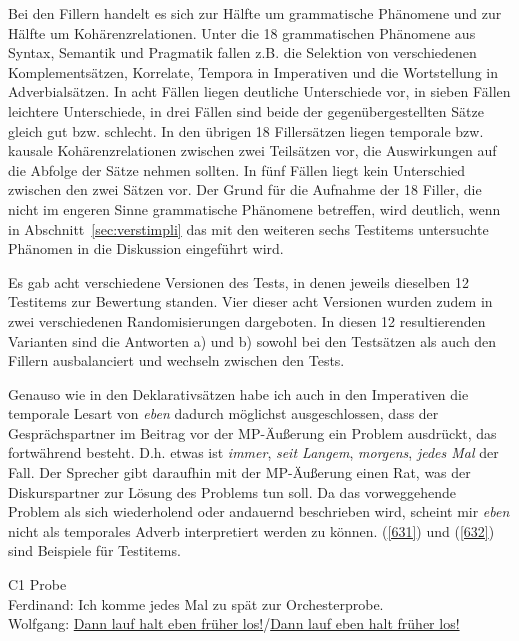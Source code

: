 Bei den Fillern handelt es sich zur Hälfte um grammatische Phänomene und zur Hälfte um  Kohärenzrelationen. Unter die 18 grammatischen Phänomene aus Syntax, Semantik und Pragmatik fallen z.B. die Selektion von verschiedenen Komplementsätzen, Korrelate, Tempora in Imperativen und die Wortstellung in Adverbialsätzen. In acht Fällen liegen deutliche Unterschiede vor, in sieben Fällen leichtere Unterschiede, in drei Fällen sind beide der gegenübergestellten Sätze gleich gut bzw. schlecht. In den übrigen 18 Fillersätzen liegen temporale bzw. kausale Kohärenzrelationen zwischen zwei Teilsätzen vor, die Auswirkungen auf die Abfolge der Sätze nehmen sollten. In fünf Fällen liegt kein Unterschied zwischen den zwei Sätzen vor. Der Grund für die Aufnahme der 18 Filler, die nicht im engeren Sinne grammatische Phänomene betreffen, wird deutlich, wenn in Abschnitt~\ref{sec:verstimpli} das mit den weiteren sechs Testitems untersuchte Phäno\-men in die Diskussion eingeführt wird.

Es gab acht verschiedene Versionen des Tests, in denen jeweils dieselben 12 Testitems zur Bewertung standen. Vier dieser acht Versionen wurden zudem in zwei verschiedenen Randomisierungen dargeboten. In diesen 12 resultierenden Varianten sind die Antworten a) und b) sowohl bei den Testsätzen als auch den Fillern ausbalanciert und wechseln zwischen den Tests.

Genauso wie in den Deklarativsätzen habe ich auch in den Imperativen die temporale Lesart von \textit{eben} dadurch möglichst ausgeschlossen, dass der Gesprächs\-partner im Beitrag vor der MP-Äußerung ein Problem ausdrückt, das fortwährend besteht. D.h. etwas ist \textit{immer}, \textit{seit Langem}, \textit{morgens}, \textit{jedes Mal} der Fall. Der Sprecher gibt daraufhin mit der MP-Äußerung einen Rat, was der Diskurspartner zur Lösung des Problems tun soll. Da das vorweggehende Problem als sich wiederholend oder andauernd beschrieben wird, scheint mir \textit{eben} nicht als temporales Adverb  interpretiert werden zu können. (\ref{631}) und (\ref{632}) sind Beispiele für Testitems.

\begin{exe}
	\ex\label{631} 
	C1 Probe\\
	Ferdinand: Ich komme jedes Mal zu spät zur Orchesterprobe.\\
	Wolfgang: \underline{Dann lauf halt eben früher los!}/\underline{Dann lauf eben halt früher los!}
\end{exe}

